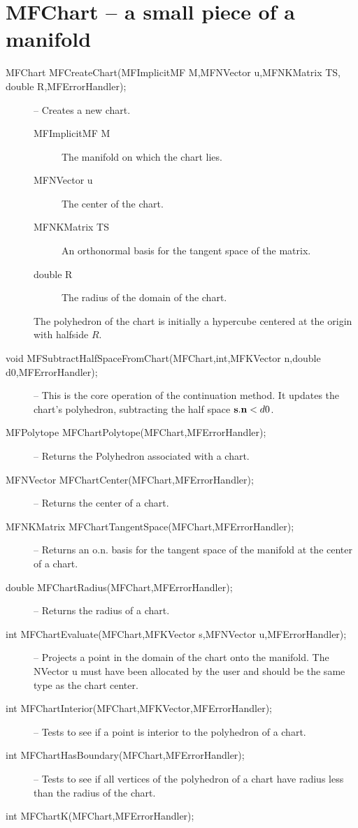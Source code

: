\documentclass[12pt]{article}
\begin{document}
\section{MFChart -- a small piece of a manifold}
\begin{description}
\item [MFChart MFCreateChart(MFImplicitMF M,MFNVector u,MFNKMatrix TS, double R,MFErrorHandler);]
-- Creates a new chart.
\begin{description}
\item [MFImplicitMF M] The manifold on which the chart lies.
\item [MFNVector u] The center of the chart.
\item [MFNKMatrix TS] An orthonormal basis for the tangent space of the matrix.
\item [double R] The radius of the domain of the chart.
\end{description}
The polyhedron of the chart is initially a hypercube centered at the origin with halfside
$R$.
\item [void MFSubtractHalfSpaceFromChart(MFChart,int,MFKVector n,double d0,MFErrorHandler);]
-- This is the core operation of the continuation method. It updates the chart's polyhedron, 
subtracting the half space ${\bf s}.{\bf n}<d0$.
\item [MFPolytope MFChartPolytope(MFChart,MFErrorHandler);]
-- Returns the Polyhedron associated with a chart.
\item [MFNVector MFChartCenter(MFChart,MFErrorHandler);]
-- Returns the center of a chart.
\item [MFNKMatrix MFChartTangentSpace(MFChart,MFErrorHandler);]
-- Returns an o.n. basis for the tangent space of the manifold at the center of a chart.
\item [double MFChartRadius(MFChart,MFErrorHandler);]
-- Returns the radius of a chart.
\item [int MFChartEvaluate(MFChart,MFKVector s,MFNVector u,MFErrorHandler);]
-- Projects a point in the domain of the chart onto the manifold.
The NVector {u} must have been allocated by the user and should be the same type as the chart center.
\item [int MFChartInterior(MFChart,MFKVector,MFErrorHandler);]
-- Tests to see if a point is interior to the polyhedron of a chart.
\item [int MFChartHasBoundary(MFChart,MFErrorHandler);]
-- Tests to see if all vertices of the polyhedron of a chart have radius less than the radius of
the chart.
\item [int MFChartK(MFChart,MFErrorHandler);]

\end{description}
\end{document}
